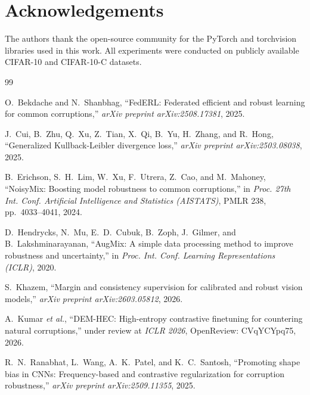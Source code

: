 \documentclass[10pt,twocolumn]{article}
\begin{document}
\section*{Acknowledgements}

The authors thank the open-source community for the PyTorch and torchvision libraries used in this work. All experiments were conducted on publicly available CIFAR-10 and CIFAR-10-C datasets.



\begin{thebibliography}{99}

O.~Bekdache and N.~Shanbhag,
``{FedERL}: Federated efficient and robust learning for common corruptions,''
\emph{arXiv preprint arXiv:2508.17381}, 2025.

J.~Cui, B.~Zhu, Q.~Xu, Z.~Tian, X.~Qi, B.~Yu, H.~Zhang, and R.~Hong,
``Generalized {Kullback-Leibler} divergence loss,''
\emph{arXiv preprint arXiv:2503.08038}, 2025.

B.~Erichson, S.~H.~Lim, W.~Xu, F.~Utrera, Z.~Cao, and M.~Mahoney,
``{NoisyMix}: Boosting model robustness to common corruptions,''
in \emph{Proc. 27th Int. Conf. Artificial Intelligence and Statistics (AISTATS)},
PMLR 238, pp.~4033--4041, 2024.

D.~Hendrycks, N.~Mu, E.~D.~Cubuk, B.~Zoph, J.~Gilmer, and B.~Lakshminarayanan,
``{AugMix}: A simple data processing method to improve robustness and uncertainty,''
in \emph{Proc. Int. Conf. Learning Representations (ICLR)}, 2020.

S.~Khazem,
``Margin and consistency supervision for calibrated and robust vision models,''
\emph{arXiv preprint arXiv:2603.05812}, 2026.

A.~Kumar \emph{et al.},
``{DEM-HEC}: High-entropy contrastive finetuning for countering natural corruptions,''
under review at \emph{ICLR 2026}, OpenReview: CVqYCYpq75, 2026.

R.~N.~Ranabhat, L.~Wang, A.~K.~Patel, and K.~C.~Santosh,
``Promoting shape bias in {CNNs}: Frequency-based and contrastive regularization for corruption robustness,''
\emph{arXiv preprint arXiv:2509.11355}, 2025.

\end{thebibliography}
\end{document}

